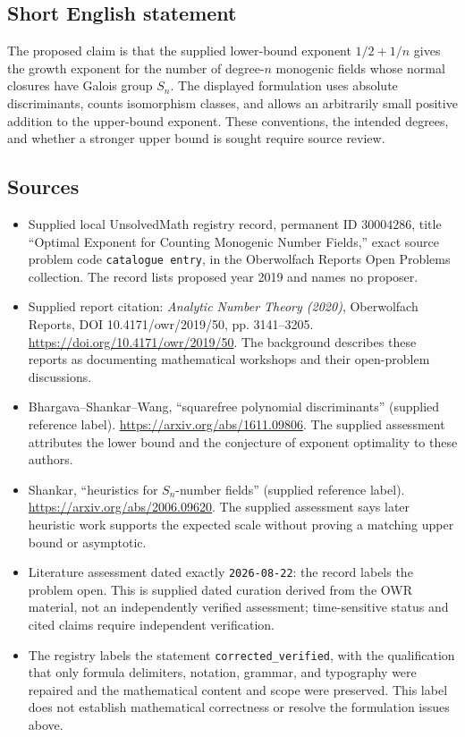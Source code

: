\documentclass[11pt]{article}
\begin{document}
\subsection{Short English statement}
The proposed claim is that the supplied lower-bound exponent \(1/2+1/n\) gives the growth exponent for the number of degree-\(n\) monogenic fields whose normal closures have Galois group \(S_n\). The displayed formulation uses absolute discriminants, counts isomorphism classes, and allows an arbitrarily small positive addition to the upper-bound exponent. These conventions, the intended degrees, and whether a stronger upper bound is sought require source review.
\subsection{Sources}
\begin{itemize}
\item Supplied local UnsolvedMath registry record, permanent ID \(30004286\), title ``Optimal Exponent for Counting Monogenic Number Fields,'' exact source problem code \texttt{catalogue entry}, in the Oberwolfach Reports Open Problems collection. The record lists proposed year 2019 and names no proposer.
\item Supplied report citation: \emph{Analytic Number Theory (2020)}, Oberwolfach Reports, DOI 10.4171/owr/2019/50, pp. 3141--3205. \url{https://doi.org/10.4171/owr/2019/50}. The background describes these reports as documenting mathematical workshops and their open-problem discussions.
\item Bhargava--Shankar--Wang, ``squarefree polynomial discriminants'' (supplied reference label). \url{https://arxiv.org/abs/1611.09806}. The supplied assessment attributes the lower bound and the conjecture of exponent optimality to these authors.
\item Shankar, ``heuristics for \(S_n\)-number fields'' (supplied reference label). \url{https://arxiv.org/abs/2006.09620}. The supplied assessment says later heuristic work supports the expected scale without proving a matching upper bound or asymptotic.
\item Literature assessment dated exactly \texttt{2026-08-22}: the record labels the problem open. This is supplied dated curation derived from the OWR material, not an independently verified assessment; time-sensitive status and cited claims require independent verification.
\item The registry labels the statement \texttt{corrected\_verified}, with the qualification that only formula delimiters, notation, grammar, and typography were repaired and the mathematical content and scope were preserved. This label does not establish mathematical correctness or resolve the formulation issues above.
\end{itemize}
\end{document}
